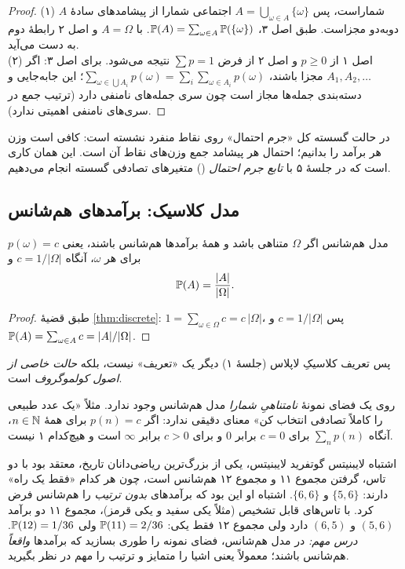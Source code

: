 \begin{proof}
(۱) $A$ شماراست، پس $A=\bigcup_{\omega\in A}\{\omega\}$ اجتماعی شمارا از پیشامدهای سادهٔ دوبه‌دو مجزاست. طبق اصل ۳، $\P(A)=\sum_{\omega\in A}\P(\{\omega\})$. با $A=\Omega$ و اصل ۲ رابطهٔ دوم به دست می‌آید.\\
(۲) اصل ۱ از $p\ge0$ و اصل ۲ از فرض $\sum p=1$ نتیجه می‌شود. برای اصل ۳: اگر $A_1,A_2,\dots$ مجزا باشند، $\sum_{\omega\in\bigcup A_i}p(\omega)=\sum_i\sum_{\omega\in A_i}p(\omega)$؛ این جابه‌جایی و دسته‌بندی جمله‌ها مجاز است چون سری جمله‌های نامنفی دارد (ترتیب جمع در سری‌های نامنفی اهمیتی ندارد).
\end{proof}

\begin{intuition}
در حالت گسسته کل «جرم احتمال» روی نقاط منفرد نشسته است: کافی است وزن هر برآمد را بدانیم؛ احتمال هر پیشامد جمع وزن‌های نقاط آن است. این همان کاری است که در جلسهٔ ۵ با \emph{تابع جرم احتمال} () متغیرهای تصادفی گسسته انجام می‌دهیم.
\end{intuition}

\subsection{مدل کلاسیک: برآمدهای هم‌شانس}

\begin{corollary}[label=cor:classical]{مدل هم‌شانس}
اگر $\Omega$ متناهی باشد و همهٔ برآمدها هم‌شانس باشند، یعنی $p(\omega)=c$ برای هر $\omega$، آنگاه $c=1/|\Omega|$ و
\[ \P(A)=\frac{|A|}{|\Omega|}. \]
\end{corollary}

\begin{proof}
طبق قضیهٔ \ref{thm:discrete}: $1=\sum_{\omega\in\Omega}c=c\,|\Omega|$، پس $c=1/|\Omega|$ و $\P(A)=\sum_{\omega\in A}c=|A|/|\Omega|$.
\end{proof}

پس تعریف کلاسیکِ لاپلاس (جلسهٔ ۱) دیگر یک «تعریف» نیست، بلکه \emph{حالت خاصی از اصول کولموگروف} است.

\begin{warning}
روی یک فضای نمونهٔ \emph{نامتناهیِ شمارا} مدل هم‌شانس وجود ندارد. مثلاً «یک عدد طبیعی را کاملاً تصادفی انتخاب کن» معنای دقیقی ندارد: اگر $p(n)=c$ برای همهٔ $n\in\N$، آنگاه $\sum_np(n)$ برای $c=0$ برابر $0$ و برای $c>0$ برابر $\infty$ است و هیچ‌کدام ۱ نیست.
\end{warning}

\begin{history}{اشتباه لایبنیتس}
گوتفرید لایبنیتس، یکی از بزرگ‌ترین ریاضی‌دانان تاریخ، معتقد بود با دو تاس، گرفتن مجموع ۱۱ و مجموع ۱۲ هم‌شانس است، چون هر کدام «فقط یک راه» دارند: $\{5,6\}$ و $\{6,6\}$. اشتباه او این بود که برآمدهای \emph{بدون ترتیب} را هم‌شانس فرض کرد. با تاس‌های قابل تشخیص (مثلاً یکی سفید و یکی قرمز)، مجموع ۱۱ دو برآمد $(5,6)$ و $(6,5)$ دارد ولی مجموع ۱۲ فقط یکی: $\P(11)=2/36$ ولی $\P(12)=1/36$.
\emph{درس مهم:} در مدل هم‌شانس، فضای نمونه را طوری بسازید که برآمدها \emph{واقعاً} هم‌شانس باشند؛ معمولاً یعنی اشیا را متمایز و ترتیب را مهم در نظر بگیرید.
\end{history}


